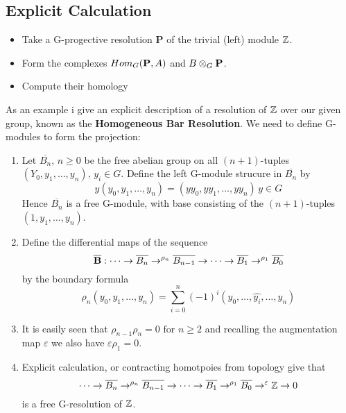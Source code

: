 \subsection{Explicit Calculation}\label{df3.3}
\begin{itemize}
    \item Take a G-progective resolution \textbf P of the trivial
    (left) module $\mathbb Z$.
    \item Form the complexes $Hom_G(\textbf P, A)$ and $B\otimes_G
    \textbf P$.
    \item Compute their homology
\end{itemize}
As an example i give an explicit description of a resolution of
$\mathbb Z$ over our given group, known as the \textbf{Homogeneous Bar
Resolution}. We need to define G-modules to form the projection:
\begin{enumerate}
    \item Let $\overline{B_n},\, n\geq 0$ be the free abelian
    group on all $(n+1)$-tuples \\ $(Y_0,y_1,\dots , y_n),\, y_i\in
    G$. Define the left G-module strucure in $\overline{B_n}$ by
    $$y(y_0, y_1, \dots , y_n) = (yy_0, yy_1, \dots , yy_n)\,
    y\in G$$
    Hence $\overline{B_n}$ is a free G-module, with base
    consisting of the $(n+1)$-tuples $(1,y_1, \dots , y_n)$.

    \item Define the differential maps of the sequence
    $$\overline{\textbf B}:\dots \rightarrow \overline{B_n}
    \rightarrow^{\rho_n} \overline{B_{n-1}}\rightarrow
    \dots\rightarrow \overline{B_1}\rightarrow^{\rho_1}
    \overline{B_0}$$
    by the boundary formula
    $$\rho_n(y_0,y_1,\dots ,y_n) = \sum_{i=0}^n {(-1)}^i
    (y_0,\dots , \widehat{y_i}, \dots , y_n)$$
    \item It is easily seen that $\rho_{n-1}\rho_n = 0 \text{ for
    } n\geq 2$ and recalling the augmentation map $\varepsilon$ we
    also have $\varepsilon \rho_1 = 0$.
    \item Explicit calculation, or contracting homotpoies from
    topology give that
    $$\dots \rightarrow \overline{B_n}\rightarrow^{\rho_n}
    \overline{B_{n-1}}\rightarrow \dots \rightarrow
    \overline{B_1}\rightarrow^{\rho_1}\overline{B_0}
    \rightarrow^\varepsilon \mathbb Z\rightarrow 0$$
    is a free G-resolution of $\mathbb Z$.
\end{enumerate}


